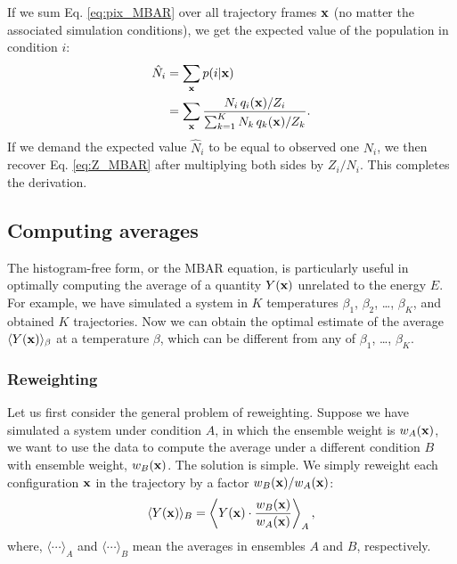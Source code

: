 \documentclass[aip,jcp,preprint,superscriptaddress]{revtex4-1}
\begin{document}
If we sum Eq. \eqref{eq:pix_MBAR}
over all trajectory frames $\mathbf{x}$
(no matter the associated simulation conditions),
we get the expected value of the population
in condition $i$:
%
\begin{align}
  \hat N_i
  &=
  \sum_{\mathbf{x}} p(i|\mathbf{x})
  \notag \\
  &=
  \sum_{\mathbf{x}}
  \frac{ N_i \, q_i(\mathbf{x}) / Z_i }
  { \sum_{k = 1}^K N_k \, q_k(\mathbf{x}) / Z_k }.
  \label{eq:Ni_WHAM}
\end{align}
%
If we demand the expected value $\hat N_i$
to be equal to observed one $N_i$,
we then recover Eq. \eqref{eq:Z_MBAR}
after multiplying both sides by $Z_i/N_i$.
%
This completes the derivation.





\subsection{\label{sec:WHAM_average}
Computing averages}



The histogram-free form, or the MBAR equation,
is particularly useful in optimally computing
the average of a quantity $Y(\mathbf{x})$
unrelated to the energy $E$.
%
For example,
we have simulated a system in $K$ temperatures
$\beta_1$, $\beta_2$, \dots, $\beta_K$,
and obtained $K$ trajectories.
%
Now we can obtain the optimal estimate
of the average $\langle Y(\mathbf{x}) \rangle_\beta$
at a temperature $\beta$,
which can be different from any of
$\beta_1$, \dots, $\beta_K$.



\subsubsection{Reweighting}



Let us first consider the general problem of reweighting.
%
Suppose we have simulated a system under condition $A$,
in which the ensemble weight is $w_A(\mathbf{x})$,
we want to use the data to compute the average
under a different condition $B$ with ensemble weight, $w_B(\mathbf{x})$.
%
The solution is simple.
%
We simply reweight each configuration $\mathbf{x}$
in the trajectory by a factor $w_B(\mathbf{x})/w_A(\mathbf{x})$:
%
\begin{align}
  \langle Y(\mathbf{x}) \rangle_B
=
  \left\langle Y(\mathbf{x}) \cdot \dfrac{ w_B(\mathbf{x}) }{ w_A(\mathbf{x}) } \right\rangle_A,
  \label{eq:reweighting}
\end{align}
%
where,
$\langle \cdots \rangle_A$
and
$\langle \cdots \rangle_B$
mean the averages in ensembles $A$ and $B$, respectively.
\end{document}

